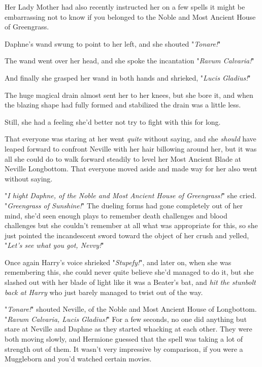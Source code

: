Her Lady Mother had also recently instructed her on a few spells it might be 
embarrassing not to know if you belonged to the Noble and Most Ancient House of 
Greengrass.

Daphne's wand swung to point to her left, and she shouted "\emph{Tonare!}"

The wand went over her head, and she spoke the incantation "\emph{Ravum 
Calvaria!}"

And finally she grasped her wand in both hands and shrieked, "\emph{Lucis 
Gladius!}"

The huge magical drain almost sent her to her knees, but she bore it, and when 
the blazing shape had fully formed and stabilized the drain was a little less.

Still, she had a feeling she'd better not try to fight with this for long.

That everyone was staring at her went \emph{quite} without saying, and she 
\emph{should} have leaped forward to confront Neville with her hair billowing 
around her, but it was all she could do to walk forward steadily to level her 
Most Ancient Blade at Neville Longbottom. That everyone moved aside and made 
way for her also went without saying.

"\emph{I hight Daphne, of the Noble and Most Ancient House of Greengrass!}" she 
cried. "\emph{Greengrass of Sunshine!}" The dueling forms had gone completely 
out of her mind, she'd seen enough plays to remember death challenges and blood 
challenges but she couldn't remember at all what was appropriate for this, so 
she just pointed the incandescent sword toward the object of her crush and 
yelled, "\emph{Let's see what you got, Nevvy!}"

Once again Harry's voice shrieked "\emph{Stupefy!}", and later on, when she was 
remembering this, she could never quite believe she'd managed to do it, but she 
slashed out with her blade of light like it was a Beater's bat, and \emph{hit 
the stunbolt back at Harry} who just barely managed to twist out of the way.

"\emph{Tonare!}" shouted Neville, of the Noble and Most Ancient House of 
Longbottom. "\emph{Ravum Calvaria, Lucis Gladius!}"
\sbreak
For a few seconds, no one did anything but stare at Neville and Daphne as they 
started whacking at each other. They were both moving slowly, and Hermione 
guessed that the spell was taking a lot of strength out of them. It wasn't very 
impressive by comparison, if you were a Muggleborn and you'd watched certain 
movies.

